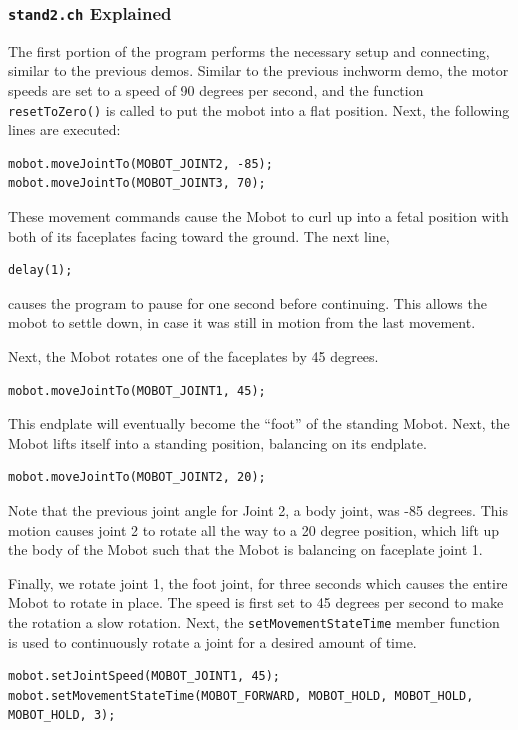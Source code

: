 \documentclass{article}
\begin{document}
\subsubsection{\texttt{stand2.ch} Explained}
The first portion of the program performs the necessary setup and connecting,
similar to the previous demos. Similar to the previous inchworm demo, the
motor speeds are set to a speed of 90 degrees per second, and the function \texttt{resetToZero()} is
called to put the mobot into a flat position. Next, the following lines
are executed:
\begin{verbatim}
mobot.moveJointTo(MOBOT_JOINT2, -85);
mobot.moveJointTo(MOBOT_JOINT3, 70);
\end{verbatim}
These movement commands cause the Mobot to curl up into a fetal position with
both of its faceplates facing toward the ground. The next line, 

\begin{verbatim}
delay(1);
\end{verbatim}
causes the program to pause for one second before continuing. This allows the
mobot to settle down, in case it was still in motion from the last movement.

Next, the Mobot rotates one 
of the faceplates by 45 degrees. 
\begin{verbatim}
mobot.moveJointTo(MOBOT_JOINT1, 45);
\end{verbatim}
This endplate will eventually become the ``foot'' of the standing Mobot. Next,
the Mobot lifts itself into a standing position, balancing on its endplate.
\begin{verbatim}
mobot.moveJointTo(MOBOT_JOINT2, 20);
\end{verbatim}
Note that the previous joint angle for Joint 2, a body joint, was -85 degrees. 
This motion causes joint 2 to rotate all the way to a 20 degree position, which
lift up the body of the Mobot such that the Mobot is balancing on faceplate joint 1.

Finally, we rotate joint 1, the foot joint, for three seconds which causes the
entire Mobot to rotate in place. The speed is first set to 45 degrees per second to make the
rotation a slow rotation. Next, the \texttt{setMovementStateTime} member function
is used to continuously rotate a joint for a desired amount of time.
\begin{verbatim}
mobot.setJointSpeed(MOBOT_JOINT1, 45);
mobot.setMovementStateTime(MOBOT_FORWARD, MOBOT_HOLD, MOBOT_HOLD, MOBOT_HOLD, 3);
\end{verbatim}
\end{document}
